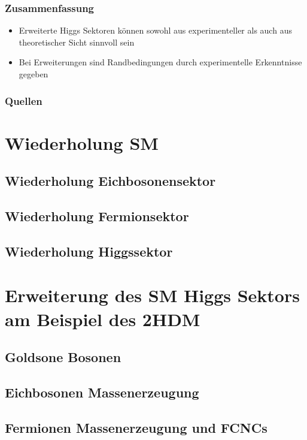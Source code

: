 \documentclass[xcolor=dvipsnames]{beamer}
\begin{document}
\begin{frame}
\frametitle{Zusammenfassung}
\begin{itemize}
\item Erweiterte Higgs Sektoren können sowohl aus experimenteller als auch aus theoretischer Sicht sinnvoll sein
\item Bei Erweiterungen sind Randbedingungen durch experimentelle Erkenntnisse gegeben 
\end{itemize}
\end{frame}

\begin{frame}
\frametitle{Quellen}
\renewcommand*{\bibfont}{\tiny}


\section{Wiederholung SM}
\subsection{Wiederholung Eichbosonensektor}
\subsection{Wiederholung Fermionsektor}
\subsection{Wiederholung Higgssektor}
\section{Erweiterung des SM Higgs Sektors am Beispiel des 2HDM}
\subsection{Goldsone Bosonen}
\subsection{Eichbosonen Massenerzeugung}
\subsection{Fermionen Massenerzeugung und FCNCs}

\nocite{*}

\printbibliography


\end{frame}

 
\end{document}
